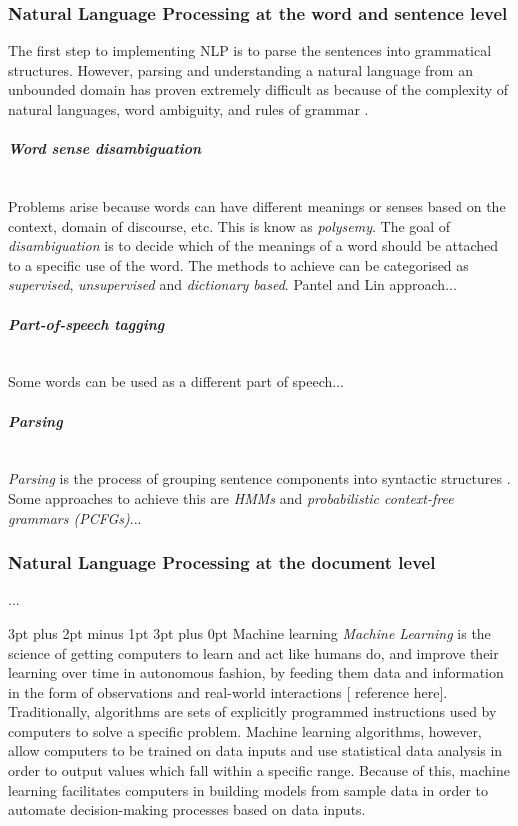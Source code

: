 \documentclass[12pt,a4paper]{article}
\makeatletter
\newcommand{\myparagraph}[1]{\paragraph{#1}\mbox{}\\} %
\renewcommand\subsection{\@startsection {subsection}{1}{2mm} %
                               {3pt plus 2pt minus 1pt} %
                               {3pt plus 0pt} %
                               {\normalfont\bfseries}}
\makeatother
\begin{document}
\subsubsection{Natural Language Processing at the word and sentence level}
The first step to implementing NLP is to parse the sentences into grammatical structures. However, parsing and understanding a natural language from an unbounded domain has proven extremely difficult as because of the complexity of natural languages, word ambiguity, and rules of grammar \cite{Martinez2010}. 

\myparagraph{\textit{Word sense disambiguation}}
Problems arise because words can have different meanings or senses based on the context, domain of discourse, etc. This is know as \textit{polysemy}. The goal of \textit{disambiguation} is to decide which of the meanings of a word should be attached to a specific use of the word. The methods to achieve can be categorised as \textit{supervised}, \textit{unsupervised} and \textit{dictionary based}. Pantel and Lin approach...

\myparagraph{\textit{Part-of-speech tagging}}
Some words can be used as a different part of speech...

\myparagraph{\textit{Parsing}}  
\textit{Parsing} is the process of grouping sentence components into syntactic structures \cite{Martinez2010}. Some approaches to achieve this are \textit{HMMs} and \textit{probabilistic context-free grammars (PCFGs)}...

\subsubsection{Natural Language Processing at the document level}
...

\subsection{Machine learning}
\textit{Machine Learning} is the science of getting computers to learn and act like humans do, and improve their learning over time in autonomous fashion, by feeding them data and information in the form of observations and real-world interactions [ reference here]. Traditionally, algorithms are sets of explicitly programmed instructions used by computers to solve a specific problem. Machine learning algorithms, however, allow computers to be trained on data inputs and use statistical data analysis in order to output values which fall within a specific range. Because of this, machine learning facilitates computers in building models from sample data in order to automate decision-making processes based on data inputs.
\end{document}
